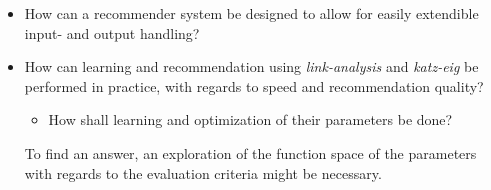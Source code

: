\begin{itemize}

    \item How can a recommender system be designed to allow for easily extendible input- and output handling?


    \item How can learning and recommendation using \textit{link-analysis} and \textit{katz-eig} be performed in practice, with regards to speed and recommendation quality?

        \begin{itemize}
            \item How shall learning and optimization of their parameters be done?
        \end{itemize}

        To find an answer, an exploration of the function space of the parameters with regards to the evaluation criteria might be necessary.

\end{itemize}

